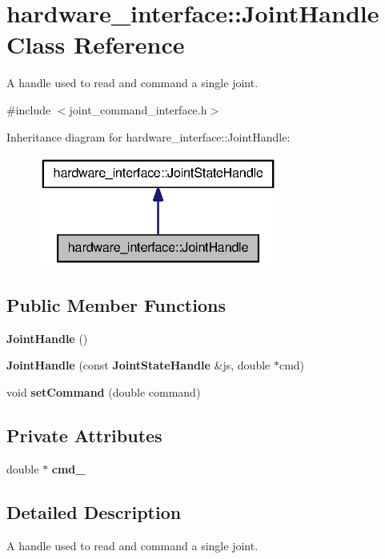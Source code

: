 \section{hardware\-\_\-interface\-:\-:\-Joint\-Handle \-Class \-Reference}
\label{classhardware__interface_1_1JointHandle}


\-A handle used to read and command a single joint.  




{\ttfamily \#include $<$joint\-\_\-command\-\_\-interface.\-h$>$}



\-Inheritance diagram for hardware\-\_\-interface\-:\-:\-Joint\-Handle\-:
\nopagebreak
\begin{figure}[H]
\begin{center}
\leavevmode
\includegraphics[width=224pt]{classhardware__interface_1_1JointHandle__inherit__graph}
\end{center}
\end{figure}
\subsection*{\-Public \-Member \-Functions}
\begin{DoxyCompactItemize}
\item 
{\bf \-Joint\-Handle} ()
\item 
{\bf \-Joint\-Handle} (const {\bf \-Joint\-State\-Handle} \&js, double $\ast$cmd)
\item 
void {\bf set\-Command} (double command)
\end{DoxyCompactItemize}
\subsection*{\-Private \-Attributes}
\begin{DoxyCompactItemize}
\item 
double $\ast$ {\bf cmd\-\_\-}
\end{DoxyCompactItemize}


\subsection{\-Detailed \-Description}
\-A handle used to read and command a single joint. 

